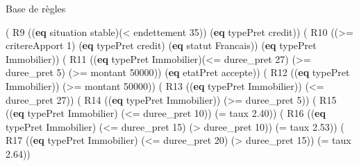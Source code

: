 \documentclass[
  ignorenonframetext,
]{beamer}
\newenvironment{Shaded}{}{}
\newcommand{\DecValTok}[1]{\textcolor[rgb]{0.25,0.63,0.44}{#1}}
\newcommand{\FloatTok}[1]{\textcolor[rgb]{0.25,0.63,0.44}{#1}}
\newcommand{\KeywordTok}[1]{\textcolor[rgb]{0.00,0.44,0.13}{\textbf{#1}}}
\newcommand{\NormalTok}[1]{#1}
\newcommand{\OperatorTok}[1]{\textcolor[rgb]{0.40,0.40,0.40}{#1}}
\begin{document}
\begin{frame}[fragile]{Base de règles}
\protect\hypertarget{base-de-ruxe8gles-1}{}
\begin{Shaded}
\begin{Highlighting}[]
\NormalTok{( R9 ((}\KeywordTok{eq}\NormalTok{ situation stable)(}\OperatorTok{\textless{}}\NormalTok{ endettement }\DecValTok{35}\NormalTok{)) }
\NormalTok{        (}\KeywordTok{eq}\NormalTok{ typePret credit))}
\NormalTok{( R10 ((}\OperatorTok{\textgreater{}=}\NormalTok{ critereApport }\DecValTok{1}\NormalTok{) (}\KeywordTok{eq}\NormalTok{ typePret credit) }
\NormalTok{    (}\KeywordTok{eq}\NormalTok{ statut Francais)) (}\KeywordTok{eq}\NormalTok{ typePret Immobilier))}
\NormalTok{( R11 ((}\KeywordTok{eq}\NormalTok{ typePret Immobilier)(}\OperatorTok{\textless{}=}\NormalTok{ duree\_pret }\DecValTok{27}\NormalTok{) }
\NormalTok{    (}\OperatorTok{\textgreater{}=}\NormalTok{ duree\_pret }\DecValTok{5}\NormalTok{) (}\OperatorTok{\textgreater{}=}\NormalTok{ montant }\DecValTok{50000}\NormalTok{)) }
\NormalTok{        (}\KeywordTok{eq}\NormalTok{ etatPret accepte))}
\NormalTok{( R12 ((}\KeywordTok{eq}\NormalTok{ typePret Immobilier)) (}\OperatorTok{\textgreater{}=}\NormalTok{ montant }\DecValTok{50000}\NormalTok{))}
\NormalTok{( R13 ((}\KeywordTok{eq}\NormalTok{ typePret Immobilier)) (}\OperatorTok{\textless{}=}\NormalTok{ duree\_pret }\DecValTok{27}\NormalTok{))}
\NormalTok{( R14 ((}\KeywordTok{eq}\NormalTok{ typePret Immobilier)) (}\OperatorTok{\textgreater{}=}\NormalTok{ duree\_pret }\DecValTok{5}\NormalTok{))}
\NormalTok{( R15 ((}\KeywordTok{eq}\NormalTok{ typePret Immobilier) (}\OperatorTok{\textless{}=}\NormalTok{ duree\_pret }\DecValTok{10}\NormalTok{)) }
\NormalTok{        (}\OperatorTok{=}\NormalTok{ taux }\FloatTok{2.40}\NormalTok{))}
\NormalTok{( R16 ((}\KeywordTok{eq}\NormalTok{ typePret Immobilier) (}\OperatorTok{\textless{}=}\NormalTok{ duree\_pret }\DecValTok{15}\NormalTok{)}
\NormalTok{        (}\OperatorTok{\textgreater{}}\NormalTok{ duree\_pret }\DecValTok{10}\NormalTok{)) (}\OperatorTok{=}\NormalTok{ taux }\FloatTok{2.53}\NormalTok{))}
\NormalTok{( R17 ((}\KeywordTok{eq}\NormalTok{ typePret Immobilier) (}\OperatorTok{\textless{}=}\NormalTok{ duree\_pret }\DecValTok{20}\NormalTok{)}
\NormalTok{        (}\OperatorTok{\textgreater{}}\NormalTok{ duree\_pret }\DecValTok{15}\NormalTok{)) (}\OperatorTok{=}\NormalTok{ taux }\FloatTok{2.64}\NormalTok{))}
\end{Highlighting}
\end{Shaded}
\end{frame}
\end{document}
